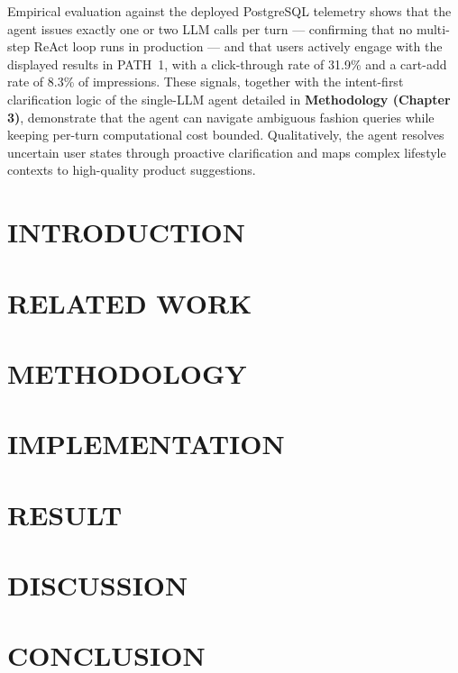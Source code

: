 \documentclass[12pt, twoside]{report}
\begin{document}
\noindent
Empirical evaluation against the deployed PostgreSQL telemetry shows that the agent issues exactly one or two LLM calls per turn --- confirming that no multi-step ReAct loop runs in production --- and that users actively engage with the displayed results in PATH~1, with a click-through rate of 31.9\% and a cart-add rate of 8.3\% of impressions. These signals, together with the intent-first clarification logic of the single-LLM agent detailed in \textbf{Methodology (Chapter 3)}, demonstrate that the agent can navigate ambiguous fashion queries while keeping per-turn computational cost bounded. Qualitatively, the agent resolves uncertain user states through proactive clarification and maps complex lifestyle contexts to high-quality product suggestions.
\chapter{INTRODUCTION}
\setcounter{page}{1}


\chapter{RELATED WORK}


\chapter{METHODOLOGY}


\chapter{IMPLEMENTATION}


\chapter{RESULT}


\chapter{DISCUSSION}


\chapter{CONCLUSION}

\end{document}
